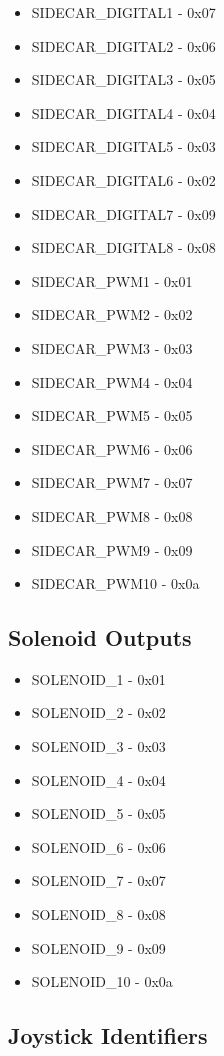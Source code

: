 \documentclass[11pt]{article} %
\begin{document}
\begin{itemize}
\item SIDECAR\_DIGITAL1 - 0x07
\item SIDECAR\_DIGITAL2 - 0x06
\item SIDECAR\_DIGITAL3 - 0x05
\item SIDECAR\_DIGITAL4 - 0x04
\item SIDECAR\_DIGITAL5 - 0x03
\item SIDECAR\_DIGITAL6 - 0x02
\item SIDECAR\_DIGITAL7 - 0x09
\item SIDECAR\_DIGITAL8 - 0x08
\item SIDECAR\_PWM1 - 0x01
\item SIDECAR\_PWM2 - 0x02
\item SIDECAR\_PWM3 - 0x03
\item SIDECAR\_PWM4 - 0x04
\item SIDECAR\_PWM5 - 0x05
\item SIDECAR\_PWM6 - 0x06
\item SIDECAR\_PWM7 - 0x07
\item SIDECAR\_PWM8 - 0x08
\item SIDECAR\_PWM9 - 0x09
\item SIDECAR\_PWM10 - 0x0a
\end{itemize}

\newpage

\subsection{Solenoid Outputs}

\begin{itemize}
\item SOLENOID\_1 - 0x01
\item SOLENOID\_2 - 0x02
\item SOLENOID\_3 - 0x03
\item SOLENOID\_4 - 0x04
\item SOLENOID\_5 - 0x05
\item SOLENOID\_6 - 0x06
\item SOLENOID\_7 - 0x07
\item SOLENOID\_8 - 0x08
\item SOLENOID\_9 - 0x09
\item SOLENOID\_10 - 0x0a
\end{itemize}

\newpage

\subsection{Joystick Identifiers}
\end{document}
